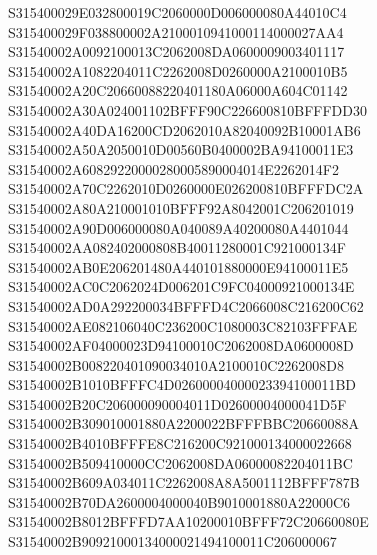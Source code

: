 \documentclass[12pt,a4paper]{article}
\begin{document}
\begin{framed}
{S315400029E032800019C2060000D006000080A44010C4\newline
S315400029F038800002A2100010941000114000027AA4\newline
S31540002A0092100013C2062008DA0600009003401117\newline
S31540002A1082204011C2262008D0260000A2100010B5\newline
S31540002A20C20660088220401180A06000A604C01142\newline
S31540002A30A024001102BFFF90C226600810BFFFDD30\newline
S31540002A40DA16200CD2062010A82040092B10001AB6\newline
S31540002A50A2050010D00560B0400002BA94100011E3\newline
S31540002A60829220000280005890004014E2262014F2\newline
S31540002A70C2262010D0260000E026200810BFFFDC2A\newline
S31540002A80A210001010BFFF92A8042001C206201019\newline
S31540002A90D006000080A040089A40200080A4401044\newline
S31540002AA082402000808B40011280001C921000134F\newline
S31540002AB0E206201480A440101880000E94100011E5\newline
S31540002AC0C2062024D006201C9FC04000921000134E\newline
S31540002AD0A292200034BFFFD4C2066008C216200C62\newline
S31540002AE082106040C236200C1080003C82103FFFAE\newline
S31540002AF04000023D94100010C2062008DA0600008D\newline
S31540002B008220401090034010A2100010C2262008D8\newline
S31540002B1010BFFFC4D02600004000023394100011BD\newline
S31540002B20C206000090004011D02600004000041D5F\newline
S31540002B309010001880A2200022BFFFBBC20660088A\newline
S31540002B4010BFFFE8C216200C921000134000022668\newline
S31540002B509410000CC2062008DA06000082204011BC\newline
S31540002B609A034011C2262008A8A5001112BFFF787B\newline
S31540002B70DA2600004000040B9010001880A22000C6\newline
S31540002B8012BFFFD7AA10200010BFFF72C20660080E\newline
S31540002B90921000134000021494100011C206000067\newline
}
\end{framed}
\end{document}
